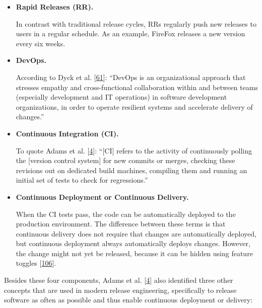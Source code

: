 \documentclass[]{book}
\begin{document}
\begin{itemize}
\item
  \textbf{Rapid Releases (RR).}

  In contrast with traditional release cycles, RRs regularly push new
  releases to users in a regular schedule. As an example, FireFox
  releases a new version every six weeks.
\item
  \textbf{DevOps.}

  According to Dyck et al. {[}\protect\hyperlink{ref-dyck2015a}{61}{]}:
  ``DevOps is an organizational approach that stresses empathy and
  cross-functional collaboration within and between teams (especially
  development and IT operations) in software development organizations,
  in order to operate resilient systems and accelerate delivery of
  changes.''
\item
  \textbf{Continuous Integration (CI).}

  To quote Adams et al. {[}\protect\hyperlink{ref-adams2016a}{4}{]}:
  ``{[}CI{]} refers to the activity of continuously polling the
  {[}version control system{]} for new commits or merges, checking these
  revisions out on dedicated build machines, compiling them and running
  an initial set of tests to check for regressions.''
\item
  \textbf{Continuous Deployment or Continuous Delivery.}

  When the CI tests pass, the code can be automatically deployed to the
  production environment. The difference between these terms is that
  continuous delivery does not require that changes are automatically
  deployed, but continuous deployment always automatically deploys
  changes. However, the change might not yet be released, because it can
  be hidden using feature toggles
  {[}\protect\hyperlink{ref-laukkanen2018a}{106}{]}.
\end{itemize}

Besides these four components, Adams et al.
{[}\protect\hyperlink{ref-adams2016a}{4}{]} also identified three other
concepts that are used in modern release engineering, specifically to
release software as often as possible and thus enable continuous
deployment or delivery:
\end{document}
